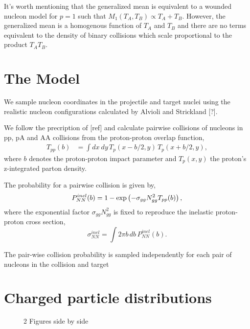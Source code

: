 \documentclass[aps,prl,reprint,amsmath,nofootinbib]{revtex4-1}
\begin{document}
It's worth mentioning that the generalized mean is equivalent to a wounded nucleon model for $p=1$ such that $M_1(T_A,T_B) \propto T_A + T_B$. However, the
generalized mean is a homogenous function of $T_A$ and $T_B$ and there are no terms equivalent to the density of binary collisions which scale proportional
to the product $T_A T_B$.


\section{The Model}
We sample nucleon coordinates in the projectile and target nuclei using the realistic nucleon configurations calculated by Alvioli 
and Strickland [?].

We follow the precription of [ref] and calculate pairwise collisions of nucleons in pp, pA and AA collisions from the proton-proton 
overlap function,
\begin{align}
 T_{pp}(b) &= \int dx~dy \,T_p(x-b/2,y) \,T_p(x+b/2,y),
\end{align}
where $b$ denotes the proton-proton impact parameter and $T_p(x,y)$ the proton's z-integrated parton density.

The probability for a pairwise collision is given by,
\begin{equation}
  P^{inel}_{NN}(b) = 1 - \exp \left(-\sigma_{gg} N_{gg}^2 T_{pp}(b) \right), \\[1ex]
\end{equation}
where the exponential factor $\sigma_{gg} N_{gg}^2$ is fixed to reproduce the inelastic proton-proton cross section,
\begin{equation}
  \sigma^{inel}_{NN} = \int 2 \pi b \,db \, P_{NN}^{inel}(b).
\end{equation}

The pair-wise collision probability is sampled independently for each pair of nucleons in the collision and target

\section{Charged particle distributions}

\begin{figure*}
    \centering
    \caption{2 Figures side by side}
    \label{fig:example}
\end{figure*}


\end{document}
